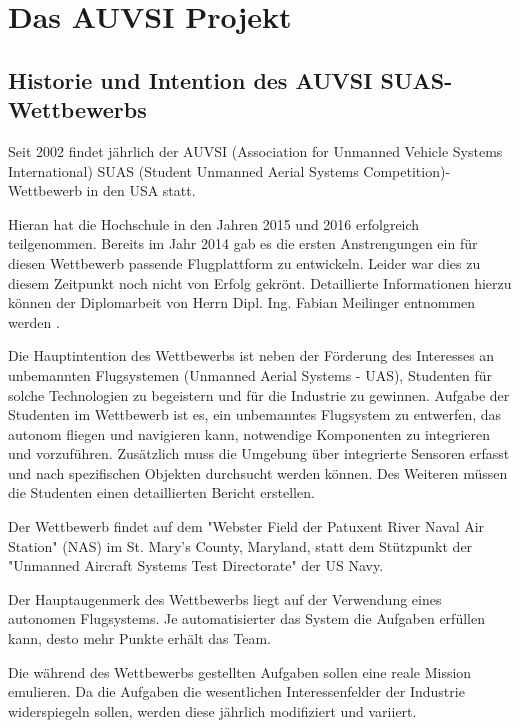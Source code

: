\chapter{Das AUVSI Projekt}\label{cha:Das AUVSI Projekt}

\section{Historie und Intention des AUVSI SUAS-Wettbewerbs}
Seit 2002 findet jährlich der AUVSI (Association for Unmanned Vehicle Systems International) SUAS (Student Unmanned Aerial Systems Competition)-Wettbewerb in den USA statt.

Hieran hat die Hochschule in den Jahren 2015 und 2016 erfolgreich teilgenommen. Bereits im Jahr 2014 gab es die ersten Anstrengungen ein für diesen Wettbewerb passende Flugplattform zu entwickeln. Leider war dies zu diesem Zeitpunkt noch nicht von Erfolg gekrönt. Detaillierte Informationen hierzu können der Diplomarbeit von Herrn Dipl. Ing. Fabian Meilinger entnommen werden \cite{Meiling}.

Die Hauptintention des Wettbewerbs ist neben der Förderung des Interesses an unbemannten Flugsystemen (Unmanned Aerial Systems - UAS), Studenten für solche Technologien zu begeistern und für die Industrie zu gewinnen. Aufgabe der Studenten im Wettbewerb ist es, ein unbemanntes Flugsystem zu entwerfen, das autonom fliegen und navigieren kann, notwendige Komponenten zu integrieren und vorzuführen. Zusätzlich muss die Umgebung über integrierte Sensoren erfasst und nach spezifischen Objekten durchsucht werden können. Des Weiteren müssen die Studenten einen detaillierten Bericht erstellen.

Der Wettbewerb findet auf dem "Webster Field der Patuxent River Naval Air Station" (NAS) im St. Mary's County, Maryland, statt dem Stützpunkt der "Unmanned Aircraft Systems Test Directorate" der US Navy.

Der Hauptaugenmerk des Wettbewerbs liegt auf der Verwendung eines autonomen Flugsystems. Je automatisierter das System die Aufgaben erfüllen kann, desto mehr Punkte erhält das Team.

Die während des Wettbewerbs gestellten Aufgaben sollen eine reale Mission emulieren. Da die Aufgaben die wesentlichen Interessenfelder der Industrie widerspiegeln sollen, werden diese jährlich modifiziert und variiert.

\clearpage

